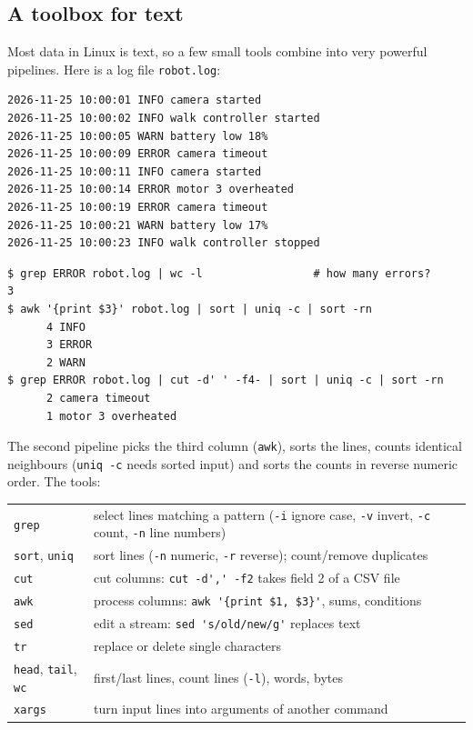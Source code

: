 \subsection*{A toolbox for text}
Most data in Linux is text, so a few small tools combine into very powerful pipelines. Here is a log file \texttt{robot.log}:
\begin{verbatim}
2026-11-25 10:00:01 INFO camera started
2026-11-25 10:00:02 INFO walk controller started
2026-11-25 10:00:05 WARN battery low 18%
2026-11-25 10:00:09 ERROR camera timeout
2026-11-25 10:00:11 INFO camera started
2026-11-25 10:00:14 ERROR motor 3 overheated
2026-11-25 10:00:19 ERROR camera timeout
2026-11-25 10:00:21 WARN battery low 17%
2026-11-25 10:00:23 INFO walk controller stopped
\end{verbatim}
\begin{verbatim}
$ grep ERROR robot.log | wc -l                 # how many errors?
3
$ awk '{print $3}' robot.log | sort | uniq -c | sort -rn
      4 INFO
      3 ERROR
      2 WARN
$ grep ERROR robot.log | cut -d' ' -f4- | sort | uniq -c | sort -rn
      2 camera timeout
      1 motor 3 overheated
\end{verbatim}
The second pipeline picks the third column (\texttt{awk}), sorts the lines, counts identical neighbours (\texttt{uniq -c} needs sorted input) and sorts the counts in reverse numeric order. The tools:
\begin{center}
\renewcommand{\arraystretch}{1.2}
\begin{tabular}{lp{10.5cm}}
\texttt{grep} & select lines matching a pattern (\texttt{-i} ignore case, \texttt{-v} invert, \texttt{-c} count, \texttt{-n} line numbers)\\
\texttt{sort}, \texttt{uniq} & sort lines (\texttt{-n} numeric, \texttt{-r} reverse); count/remove duplicates\\
\texttt{cut} & cut columns: \verb|cut -d',' -f2| takes field 2 of a CSV file\\
\texttt{awk} & process columns: \verb|awk '{print $1, $3}'|, sums, conditions\\
\texttt{sed} & edit a stream: \verb|sed 's/old/new/g'| replaces text\\
\texttt{tr} & replace or delete single characters\\
\texttt{head}, \texttt{tail}, \texttt{wc} & first/last lines, count lines (\texttt{-l}), words, bytes\\
\texttt{xargs} & turn input lines into arguments of another command\\
\end{tabular}
\end{center}

